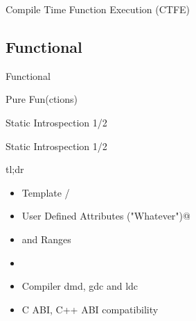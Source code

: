 \documentclass[xelatex,10pt]{beamer}
\begin{document}
\begin{frame}{Compile Time Function Execution (CTFE)}

\end{frame}

\subsection{Functional}
\begin{frame}{Functional}

\end{frame}

\begin{frame}{Pure Fun(ctions)}

\end{frame}

\begin{frame}{Static Introspection 1/2}



\end{frame}

\begin{frame}{Static Introspection 1/2}

\end{frame}

\begin{frame}{tl;dr}
\begin{itemize}
	\item Template \lstinline@struct@es/\lstinline@class@es
	\item User Defined Attributes \lstinline@\@Bar("Whatever")@
	\item \lstinline@foreach@ and Ranges
	\item \lstinline@module@s
	\item Compiler dmd, gdc and ldc
	\item C ABI, C++ ABI compatibility
\end{itemize}
\end{frame}
\end{document}
